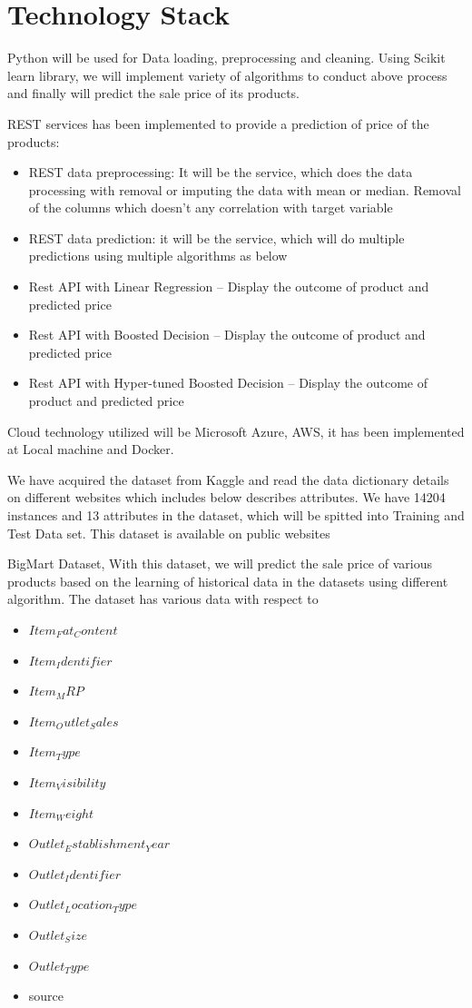 \section{Technology Stack}

Python will be used for Data loading, preprocessing and cleaning. Using 
Scikit learn library, we will implement variety of algorithms to conduct 
above process and finally will predict the sale price of its products.

REST services has been implemented to provide a prediction of price of the 
products:

\begin{itemize}
	\item REST data preprocessing: It will be the service, which does 
the data processing 
	with removal or imputing the data with mean or median. Removal of 
the columns which doesn’t any correlation with target variable
	\item REST data prediction: it will be the service, which will 
do multiple predictions using multiple algorithms as below
	
	\item Rest API with Linear Regression – Display the outcome 
of product and predicted price
	\item Rest API with Boosted Decision – Display the outcome of 
product and predicted price
	\item Rest API with Hyper-tuned Boosted Decision – Display the 
outcome of product and predicted price
\end{itemize}

Cloud technology utilized will be Microsoft Azure, AWS, it has been 
implemented at Local machine and Docker.

We have acquired the dataset from Kaggle and read the data dictionary details 
on different websites which includes below describes attributes. We have 14204 
instances and 13 attributes in the dataset, which will be spitted into 
Training and Test Data set. This dataset is available on public websites

BigMart Dataset, With this dataset, we will predict the sale price of 
various products based on the learning of historical data in the datasets 
using different algorithm. The dataset has various data with respect to
\begin{itemize}
\item $Item_Fat_Content$
\item $Item_Identifier$
\item $Item_MRP$
\item $Item_Outlet_Sales$
\item $Item_Type$
\item $Item_Visibility$
\item $Item_Weight$
\item $Outlet_Establishment_Year$
\item $Outlet_Identifier$
\item $Outlet_Location_Type$
\item $Outlet_Size$
\item $Outlet_Type$
\item source
\end{itemize}
~\cite{kaggleds}


